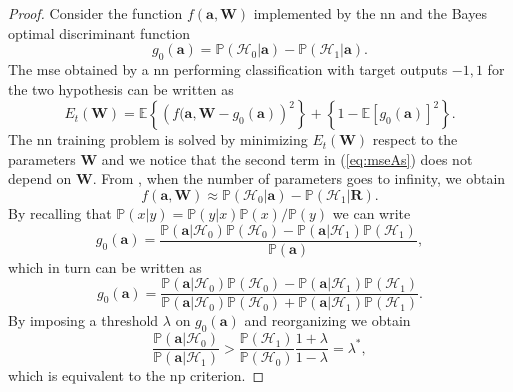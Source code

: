 \documentclass[draftcls,onecolumn,12pt]{IEEEtran}
\begin{document}
\begin{proof}
Consider the function $f(\bm{a},\bm{W})$ implemented by the \ac{nn} and the Bayes optimal discriminant function
\begin{equation}
g_0(\bm{a}) = \mathbb{P}(\mathcal{H}_0|\bm{a}) - \mathbb{P}(\mathcal{H}_1|\bm{a}).
\end{equation} 
The \ac{mse} obtained by a \ac{nn} performing classification with target outputs ${-1,1}$ for the two hypothesis can be written as \cite{Ruck-90}
\begin{equation}\label{eq:mseAs}
E_t(\bm{W}) = \mathbb{E} \left\{ \left( f(\bm{a},\bm{W} - g_0(\bm{a}) \right)^2 \right\} + \left \{1-\mathbb{E}[g_0(\bm{a})]^2\right \}.
\end{equation}
The \ac{nn} training problem is solved by minimizing $E_t(\bm{W})$ respect to the parameters $\bm{W}$ and we notice that the second term in (\ref{eq:mseAs}) does not depend on $\bm{W}$.
From \cite{Ruck-90}, when the number of parameters goes to infinity, we obtain
\begin{equation}\label{eq:bayesDisc}
f(\bm{a},\bm{W}) \approx \mathbb{P}(\mathcal{H}_0|\bm{a}) - \mathbb{P}(\mathcal{H}_1|\bm{R}). 
\end{equation}
By recalling that $\mathbb{P}(x|y)=\mathbb{P}(y|x)\mathbb{P}(x)/\mathbb{P}(y)$ we can write
\begin{equation}
g_0(\bm{a}) = \frac{{\mathbb P}(\bm{a}|\mathcal H_0){\mathbb P}(\mathcal H_0) - {\mathbb P}(\bm{a}|\mathcal H_1){\mathbb P}(\mathcal H_1)}{\mathbb P(\bm{a})},
\end{equation}
which in turn can be written as
\begin{equation}
g_0(\bm{a}) = \frac{{\mathbb P}(\bm{a}|\mathcal H_0){\mathbb P}(\mathcal H_0) - {\mathbb P}(\bm{a}|\mathcal H_1){\mathbb P}(\mathcal H_1)}{{\mathbb P}(\bm{a}|\mathcal H_0){\mathbb P}(\mathcal H_0) + {\mathbb P}(\bm{a}|\mathcal H_1){\mathbb P}(\mathcal H_1)}.
\end{equation}
By imposing a threshold $\lambda$ on $g_0(\bm{a})$ and reorganizing we obtain
\begin{equation}
\frac{{\mathbb P}(\bm{a}|\mathcal H_0)}{{\mathbb P}(\bm{a}|\mathcal H_1)}>   \frac{{\mathbb P}(\mathcal H_1)}{{\mathbb P}(\mathcal H_0)} \frac{1 + \lambda}{1-\lambda} = \lambda^*,
\end{equation}
which is equivalent to the \ac{np} criterion.
\end{proof}
\end{document}
